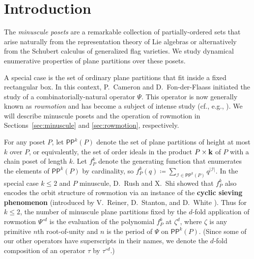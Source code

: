 \documentclass[12pt]{amsart}
\theoremstyle{definition}
\theoremstyle{remark}
\numberwithin{equation}{section}
\newcommand{\pp}{\ensuremath{\mathsf{PP}}}
\begin{document}
\maketitle


%
\section{Introduction}
%
\label{sec:introduction}

The \emph{minuscule posets} are a remarkable collection of partially-ordered sets that arise naturally from the representation theory of Lie algebras or alternatively from the Schubert calculus of generalized flag varieties. We study dynamical enumerative properties of plane partitions over these posets.

A special case is the set of ordinary plane partitions that fit inside a fixed rectangular box. In this context, P.~Cameron and D.~Fon-der-Flaass \cite{Cameron.Fonderflaass} initiated the study of a combinatorially-natural operator $\Psi$. This operator is now generally known as \emph{rowmotion} and has become a subject of intense study (cf., e.g., \cite{Panyushev,Striker.Williams,Armstrong.Stump.Thomas,Rush.Shi,Einstein.Propp,Propp.Roby,Grinberg.Roby:2,Grinberg.Roby:1,DPS,Vorland, Dilks.Striker.Vorland}).
We will describe minuscule posets and the operation of rowmotion in Sections~\ref{sec:minuscule} and \ref{sec:rowmotion}, respectively.

For any poset $P$, let $\pp^k(P)$ denote the set of plane partitions of height at most $k$ over $P$, or equivalently, the set of order ideals in the product $P \times {\bf k}$ of $P$ with a chain poset of length $k$. Let $f_P^k$ denote the generating function that enumerates the elements of $\pp^k(P)$  by cardinality, so 
$f_P^k(q) \coloneqq \sum_{\mathcal{I} \in \pp^k(P)} q^{|\mathcal{I}|}.$ In the special case $k \leq 2$ and $P$ minuscule, D.~Rush and X.~Shi \cite{Rush.Shi} showed that $f_P^k$ also encodes the orbit structure of rowmotion via an instance of the {\bf cyclic sieving phenomenon} (introduced by V.~Reiner, D.~Stanton, and D.~White \cite{Reiner.Stanton.White}). Thus for $k \leq 2$, the number of minuscule plane partitions fixed by the $d$-fold application of rowmotion $\Psi^{\circ d}$ is the evaluation of the polynomial $f_P^k$ at $\zeta^d$, where $\zeta$ is any primitive $n$th root-of-unity and $n$ is the period of $\Psi$ on $\pp^k(P)$. (Since some of our other operators have superscripts in their names, we denote the $d$-fold composition of an operator $\tau$ by $\tau^{\circ d}$.)
\end{document}
